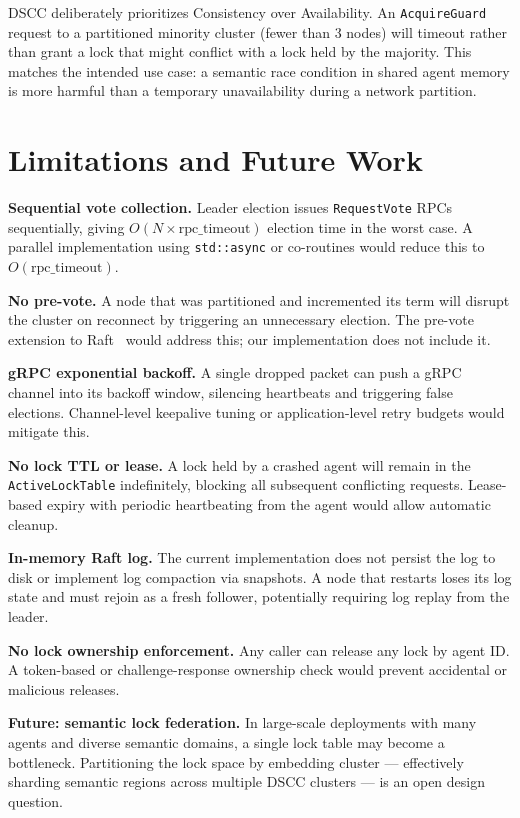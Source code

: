 \documentclass[sigconf]{acmart}
\begin{document}
DSCC deliberately prioritizes Consistency over Availability. An \texttt{AcquireGuard}
request to a partitioned minority cluster (fewer than 3 nodes) will timeout rather than
grant a lock that might conflict with a lock held by the majority. This matches the
intended use case: a semantic race condition in shared agent memory is more harmful than
a temporary unavailability during a network partition.

\section{Limitations and Future Work}
\label{sec:limitations}

\textbf{Sequential vote collection.} Leader election issues \texttt{RequestVote} RPCs
sequentially, giving $O(N \times \text{rpc\_timeout})$ election time in the worst case.
A parallel implementation using \texttt{std::async} or co-routines would reduce this to
$O(\text{rpc\_timeout})$.

\textbf{No pre-vote.} A node that was partitioned and incremented its term will disrupt
the cluster on reconnect by triggering an unnecessary election. The pre-vote extension
to Raft~\cite{raft} would address this; our implementation does not include it.

\textbf{gRPC exponential backoff.} A single dropped packet can push a gRPC channel into
its backoff window, silencing heartbeats and triggering false elections. Channel-level
keepalive tuning or application-level retry budgets would mitigate this.

\textbf{No lock TTL or lease.} A lock held by a crashed agent will remain in the
\texttt{ActiveLockTable} indefinitely, blocking all subsequent conflicting requests.
Lease-based expiry with periodic heartbeating from the agent would allow automatic
cleanup.

\textbf{In-memory Raft log.} The current implementation does not persist the log to disk
or implement log compaction via snapshots. A node that restarts loses its log state and
must rejoin as a fresh follower, potentially requiring log replay from the leader.

\textbf{No lock ownership enforcement.} Any caller can release any lock by agent ID.
A token-based or challenge-response ownership check would prevent accidental or malicious
releases.

\textbf{Future: semantic lock federation.} In large-scale deployments with many agents
and diverse semantic domains, a single lock table may become a bottleneck. Partitioning
the lock space by embedding cluster — effectively sharding semantic regions across
multiple DSCC clusters — is an open design question.
\end{document}
